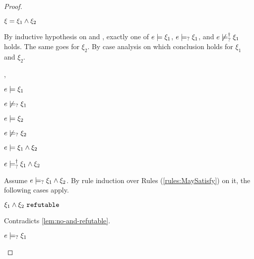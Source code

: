 \begin{proof}
\begin{byCases}
\item[\text{(\ref{rule:CTAnd})}]
    \begin{pfsteps*}
    \item $\xi=\xi_1 \wedge \xi_2$ 
    \end{pfsteps*}
    By inductive hypothesis on  and , exactly one of $e \models \xi_1$, $e \models_{?} \xi_1$, and $e \not\models_{?}^{\dag} \xi_1$ holds. The same goes for $\xi_2$. By case analysis on which conclusion holds for $\xi_1$ and $\xi_2$.
    \begin{byCases}
    \item[\csatisfy{e}{\xi_1},\csatisfy{e}{\xi_2}]
        \begin{pfsteps*}
        \item $e \models \xi_1$  
        \item $e \not\models_{?} \xi_1$  
        \item $e \models \xi_2$  
        \item $e \not\models_{?} \xi_2$  
        \item $e \models \xi_1 \wedge \xi_2$  
        \item $e \models_{?}^{\dag} \xi_1 \wedge \xi_2$ 
        \end{pfsteps*}
        Assume $e \models_{?} \xi_1 \wedge \xi_2$. By rule induction over Rules (\ref{rules:MaySatisfy}) on it, the following cases apply.
        \begin{byCases}
        \item[\text{(\ref{rule:CMSNotVal})}]
            \begin{pfsteps*}
            \item $\xi_1 \wedge \xi_2 ~\mathtt{refutable}$ 
            \end{pfsteps*}
            Contradicts \autoref{lem:no-and-refutable}.
        \item[\text{(\ref{rule:CMSAnd1})}]
            \begin{pfsteps*}
            \item $e \models_{?} \xi_1$ 

\end{pfsteps*}
\end{byCases}
\end{byCases}
\end{byCases}
\end{proof}
